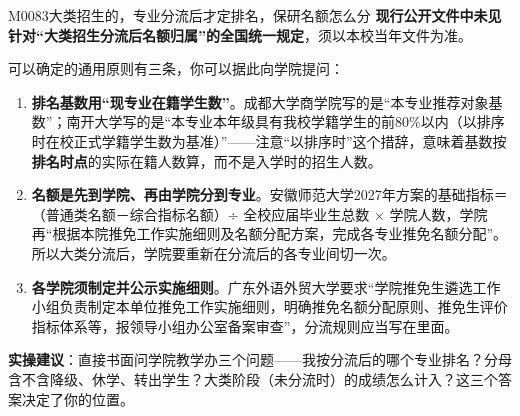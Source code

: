 \begin{qa}{M0083}{大类招生的，专业分流后才定排名，保研名额怎么分}
\textbf{现行公开文件中未见针对“大类招生分流后名额归属”的全国统一规定}，须以本校当年文件为准。

可以确定的通用原则有三条，你可以据此向学院提问：

\begin{enumerate}
  \item \textbf{排名基数用“现专业在籍学生数”}。成都大学商学院写的是“本专业推荐对象基数”；南开大学写的是“本专业本年级具有我校学籍学生的前80\%以内（以排序时在校正式学籍学生数为基准）”——注意“以排序时”这个措辞，意味着基数按\textbf{排名时点}的实际在籍人数算，而不是入学时的招生人数。
  \item \textbf{名额是先到学院、再由学院分到专业}。安徽师范大学2027年方案的基础指标＝（普通类名额－综合指标名额）÷ 全校应届毕业生总数 × 学院人数，学院再“根据本院推免工作实施细则及名额分配方案，完成各专业推免名额分配”。所以大类分流后，学院要重新在分流后的各专业间切一次。
  \item \textbf{各学院须制定并公示实施细则}。广东外语外贸大学要求“学院推免生遴选工作小组负责制定本单位推免工作实施细则，明确推免名额分配原则、推免生评价指标体系等，报领导小组办公室备案审查”，分流规则应当写在里面。
\end{enumerate}

\textbf{实操建议}：直接书面问学院教学办三个问题——我按分流后的哪个专业排名？分母含不含降级、休学、转出学生？大类阶段（未分流时）的成绩怎么计入？这三个答案决定了你的位置。
\end{qa}

